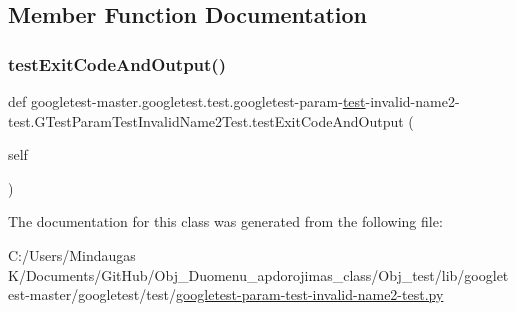 \subsection{Member Function Documentation}
\mbox{\label{classgoogletest-master_1_1googletest_1_1test_1_1googletest-param-test-invalid-name2-test_1_1_g_tff88aa7127808d8f576f122583350856_a4848b8f8a798a0bcb9321dc359b70f9d}} 
\subsubsection{\texorpdfstring{testExitCodeAndOutput()}{testExitCodeAndOutput()}}
{\footnotesize\ttfamily def googletest-\/master.\+googletest.\+test.\+googletest-\/param-\/\mbox{\hyperlink{_mutual_8h_a707ee03719e99670bf6cfdfd897b8456}{test}}-\/invalid-\/name2-\/test.\+G\+Test\+Param\+Test\+Invalid\+Name2\+Test.\+test\+Exit\+Code\+And\+Output (\begin{DoxyParamCaption}\item[{}]{self }\end{DoxyParamCaption})}



The documentation for this class was generated from the following file\+:\begin{DoxyCompactItemize}
\item 
C\+:/\+Users/\+Mindaugas K/\+Documents/\+Git\+Hub/\+Obj\+\_\+\+Duomenu\+\_\+apdorojimas\+\_\+class/\+Obj\+\_\+test/lib/googletest-\/master/googletest/test/\mbox{\hyperlink{_obj__test_2lib_2googletest-master_2googletest_2test_2googletest-param-test-invalid-name2-test_8py}{googletest-\/param-\/test-\/invalid-\/name2-\/test.\+py}}\end{DoxyCompactItemize}
